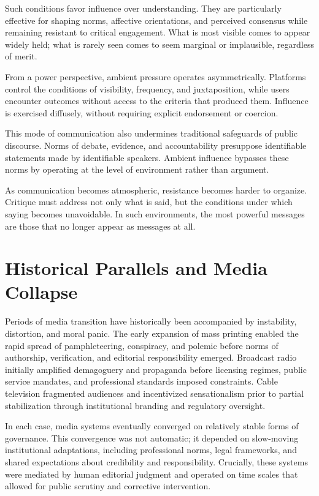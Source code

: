 \documentclass[12pt]{article}
\begin{document}
Such conditions favor influence over understanding. They are particularly effective for shaping norms, affective orientations, and perceived consensus while remaining resistant to critical engagement. What is most visible comes to appear widely held; what is rarely seen comes to seem marginal or implausible, regardless of merit.

From a power perspective, ambient pressure operates asymmetrically. Platforms control the conditions of visibility, frequency, and juxtaposition, while users encounter outcomes without access to the criteria that produced them. Influence is exercised diffusely, without requiring explicit endorsement or coercion.

This mode of communication also undermines traditional safeguards of public discourse. Norms of debate, evidence, and accountability presuppose identifiable statements made by identifiable speakers. Ambient influence bypasses these norms by operating at the level of environment rather than argument.

As communication becomes atmospheric, resistance becomes harder to organize. Critique must address not only what is said, but the conditions under which saying becomes unavoidable. In such environments, the most powerful messages are those that no longer appear as messages at all.

\section{Historical Parallels and Media Collapse}

Periods of media transition have historically been accompanied by instability, distortion, and moral panic. The early expansion of mass printing enabled the rapid spread of pamphleteering, conspiracy, and polemic before norms of authorship, verification, and editorial responsibility emerged. Broadcast radio initially amplified demagoguery and propaganda before licensing regimes, public service mandates, and professional standards imposed constraints. Cable television fragmented audiences and incentivized sensationalism prior to partial stabilization through institutional branding and regulatory oversight.

In each case, media systems eventually converged on relatively stable forms of governance. This convergence was not automatic; it depended on slow-moving institutional adaptations, including professional norms, legal frameworks, and shared expectations about credibility and responsibility. Crucially, these systems were mediated by human editorial judgment and operated on time scales that allowed for public scrutiny and corrective intervention.
\end{document}
